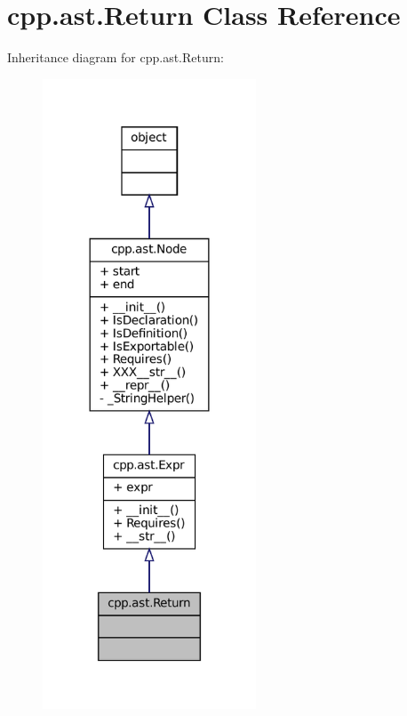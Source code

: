 \hypertarget{classcpp_1_1ast_1_1Return}{}\section{cpp.\+ast.\+Return Class Reference}
\label{classcpp_1_1ast_1_1Return}


Inheritance diagram for cpp.\+ast.\+Return\+:
\nopagebreak
\begin{figure}[H]
\begin{center}
\leavevmode
\includegraphics[width=180pt]{classcpp_1_1ast_1_1Return__inherit__graph}
\end{center}
\end{figure}


